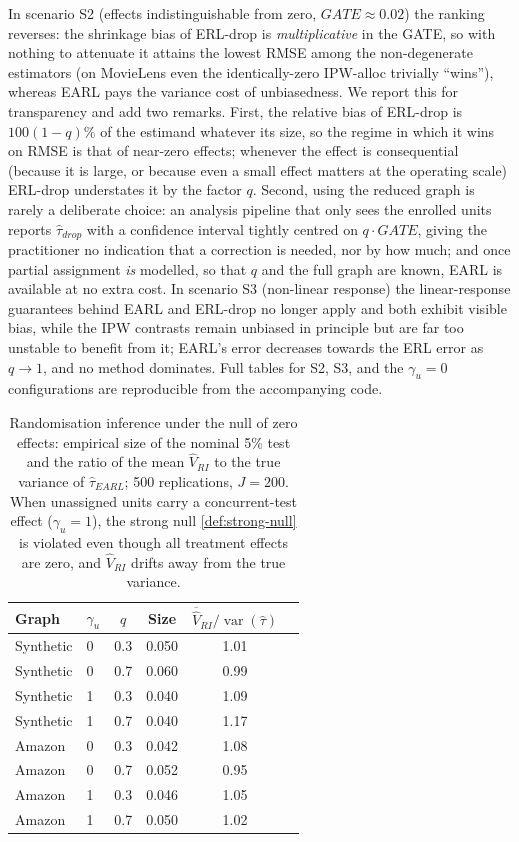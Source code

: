 \documentclass[sigconf,nonacm]{acmart}
\DeclareMathOperator{\var}{var}
\begin{document}
In scenario S2 (effects indistinguishable from zero, $GATE\approx0.02$) the ranking reverses: the shrinkage bias of ERL-drop is \emph{multiplicative} in the GATE, so with nothing to attenuate it attains the lowest RMSE among the non-degenerate estimators (on MovieLens even the identically-zero IPW-alloc trivially ``wins''), whereas EARL pays the variance cost of unbiasedness. We report this for transparency and add two remarks. First, the relative bias of ERL-drop is $100(1-q)\%$ of the estimand whatever its size, so the regime in which it wins on RMSE is that of near-zero effects; whenever the effect is consequential (because it is large, or because even a small effect matters at the operating scale) ERL-drop understates it by the factor $q$. Second, using the reduced graph is rarely a deliberate choice: an analysis pipeline that only sees the enrolled units reports $\hat\tau_{drop}$ with a confidence interval tightly centred on $q\cdot GATE$, giving the practitioner no indication that a correction is needed, nor by how much; and once partial assignment \emph{is} modelled, so that $q$ and the full graph are known, EARL is available at no extra cost. In scenario S3 (non-linear response) the linear-response guarantees behind EARL and ERL-drop no longer apply and both exhibit visible bias, while the IPW contrasts remain unbiased in principle but are far too unstable to benefit from it; EARL's error decreases towards the ERL error as $q\to1$, and no method dominates. Full tables for S2, S3, and the $\gamma_u=0$ configurations are reproducible from the accompanying code.

\begin{table}
\caption{Randomisation inference under the null of zero effects: empirical size of the nominal 5\% test and the ratio of the mean $\hat V_{RI}$ to the true variance of $\hat\tau_{EARL}$; 500 replications, $J=200$. When unassigned units carry a concurrent-test effect ($\gamma_u=1$), the strong null \eqref{def:strong-null} is violated even though all treatment effects are zero, and $\hat V_{RI}$ drifts away from the true variance.}
\label{tab:ri}
\begin{tabular}{llcccc}
\toprule
Graph & $\gamma_u$ & $q$ & Size & $\overline{\hat V}_{RI}/\var(\hat\tau)$\\
\midrule
Synthetic & 0 & 0.3 & 0.050 & 1.01\\
Synthetic & 0 & 0.7 & 0.060 & 0.99\\
Synthetic & 1 & 0.3 & 0.040 & 1.09\\
Synthetic & 1 & 0.7 & 0.040 & 1.17\\
Amazon & 0 & 0.3 & 0.042 & 1.08\\
Amazon & 0 & 0.7 & 0.052 & 0.95\\
Amazon & 1 & 0.3 & 0.046 & 1.05\\
Amazon & 1 & 0.7 & 0.050 & 1.02\\
\bottomrule
\end{tabular}
\end{table}
\end{document}
